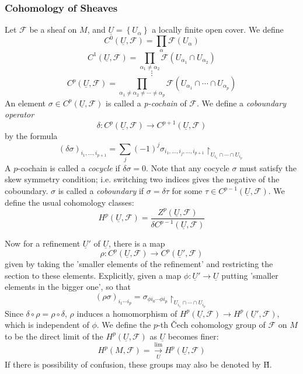\documentclass{article}
\begin{document}
\subsubsection{Cohomology of Sheaves}

Let $ \mathcal{F}$ be a sheaf on $M$, and $\underline{U} = \left\{ U_{\alpha} \right\} $ a locally finite open cover. We define
\[
	C^0 \left( \underline{U}, \mathcal{F} \right) = \prod_{\alpha} \mathcal{F}(U_{\alpha})
\]
\[
	C^1 \left( \underline{U}, \mathcal{F} \right) = \prod_{\alpha_1 \neq \alpha_2} \mathcal{F} \left( U_{\alpha_1} \cap U_{\alpha_2} \right) 
\]
\[
\vdots
\]
\[
	C^p( \underline{U}, \mathcal{F}) = \prod_{\alpha_1 \neq \alpha_2 \neq \cdots \neq \alpha_p} \mathcal{F} \left( U_{\alpha_1} \cap \cdots \cap U_{\alpha_p} \right) 
\]
An element $\sigma \in C^p \left( \underline{U}, \mathcal{F} \right) $ is called a \textit{p-cochain} of $ \mathcal{F}$. We define a \textit{coboundary operator}
\[
	\delta: C^p \left( \underline{U}, \mathcal{F} \right)  \to C^{p+1} \left( \underline{U}, \mathcal{F} \right) 
\]
by the formula
\[
	\left( \delta \sigma \right)_{i_1, \ldots, i_{p+1}} = \sum_j (-1)^j \sigma_{i_1, \ldots, i_j, \ldots, i_{p+1}} \restriction_{U_{i_1} \cap \cdots \cap U_{i_p}}
\]
\indent A $p$-cochain is called a \textit{cocycle} if $\delta \sigma = 0$. Note that any cocycle $\sigma$ must satisfy the skew symmetry condition; i.e. switching two indices gives the negative of the coboundary. $\sigma$ is called a \textit{coboundary} if $\sigma = \delta \tau$ for some $\tau \in C^{p-1} \left( \underline{U}, \mathcal{F} \right)$. We define the usual cohomology classes:
\[
H^p \left( \underline{U}, \mathcal{F} \right) = \frac{Z^p \left( \underline{U}, \mathcal{F} \right) }{\delta C^{p-1} \left( \underline{U}, \mathcal{F} \right) }
\]

Now for a refinement $ \underline{U}'$ of $ \underline{U}$, there is a map
\[
	\rho: C^p( \underline{U}, \mathcal{F}) \to C^p \left( \underline{U}', \mathcal{F} \right) 
\]
given by taking the 'smaller elements of the refinement' and restricting the section to these elements. Explicitly, given a map $\phi: \underline{U}' \to \underline{U}$ putting 'smaller elements in the bigger one', so that
\[
	\left( \rho \sigma \right)_{i_1 \cdots i_p} = \sigma_{ \phi i_0 \cdots \phi i_p} \restriction_{ U_{i_1} \cap \cdots \cap U_{i_p} }
\]
Since $\delta \circ \rho = \rho \circ \delta$, $\rho$ induces a homomorphism of $H^p \left( \underline{U}, \mathcal{F} \right) \to H^p \left( \underline{U}', \mathcal{F} \right) $, which is independent of $\phi$. We define the $p$-th \v{C}ech cohomology group of $ \mathcal{F}$ on $M$ to be the direct limit of the $H^p \left( \underline{U}, \mathcal{F} \right) $ as $ \underline{U}$ becomes finer:
\[
	H^p \left( M, \mathcal{F} \right) = \xrightarrow[U]{ \mathrm{lim} } H^p \left( \underline{U}, \mathcal{F} \right) 
\]
If there is possibility of confusion, these groups may also be denoted by \v{H}.
\end{document}
